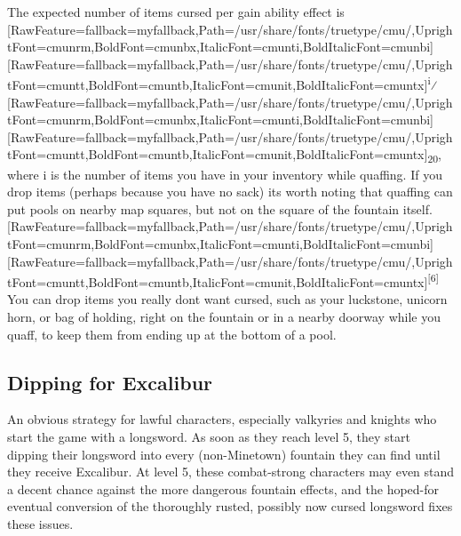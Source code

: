 The expected number of items cursed per gain ability effect is \allowbreak{}\setmainfont{cmunrm.ttf}[RawFeature={fallback=myfallback},Path=/usr/share/fonts/truetype/cmu/,UprightFont=cmunrm,BoldFont=cmunbx,ItalicFont=cmunti,BoldItalicFont=cmunbi]\setmonofont{cmunrm.ttf}[RawFeature={fallback=myfallback},Path=/usr/share/fonts/truetype/cmu/,UprightFont=cmuntt,BoldFont=cmuntb,ItalicFont=cmunit,BoldItalicFont=cmuntx]\textsuperscript{i}⁄\allowbreak{}\setmainfont{cmunrm.ttf}[RawFeature={fallback=myfallback},Path=/usr/share/fonts/truetype/cmu/,UprightFont=cmunrm,BoldFont=cmunbx,ItalicFont=cmunti,BoldItalicFont=cmunbi]\setmonofont{cmunrm.ttf}[RawFeature={fallback=myfallback},Path=/usr/share/fonts/truetype/cmu/,UprightFont=cmuntt,BoldFont=cmuntb,ItalicFont=cmunit,BoldItalicFont=cmuntx]\textsubscript{20}, where i is the number of items you have in your inventory while quaffing. If you drop items (perhaps because you have no sack) it\textquotesingle{}s worth noting that quaffing can put pools on nearby map squares, but not on the square of the fountain itself. \allowbreak{}\setmainfont{cmunrm.ttf}[RawFeature={fallback=myfallback},Path=/usr/share/fonts/truetype/cmu/,UprightFont=cmunrm,BoldFont=cmunbx,ItalicFont=cmunti,BoldItalicFont=cmunbi]\setmonofont{cmunrm.ttf}[RawFeature={fallback=myfallback},Path=/usr/share/fonts/truetype/cmu/,UprightFont=cmuntt,BoldFont=cmuntb,ItalicFont=cmunit,BoldItalicFont=cmuntx]\textsuperscript{{$\text{[}$}6{$\text{]}$}} You can drop items you really don\textquotesingle{}t want cursed, such as your luckstone\footnotemark[106], unicorn horn\footnotemark[107], or bag of holding\footnotemark[108], right on the fountain or in a nearby doorway while you quaff, to keep them from ending up at the bottom of a pool.



\subsection{Dipping for Excalibur}
\label{13}
An obvious strategy for lawful\footnotemark[109] characters, especially valkyries\footnotemark[110] and knights\footnotemark[111] who start the game with a longsword. As soon as they reach level 5, they start dipping their longsword into every (non-{}Minetown\footnotemark[112]) fountain they can find until they receive Excalibur\footnotemark[113]. At level 5, these combat-{}strong characters may even stand a decent chance against the more dangerous fountain effects, and the hoped-{}for eventual conversion of the thoroughly rusted, possibly now cursed longsword fixes these issues.



